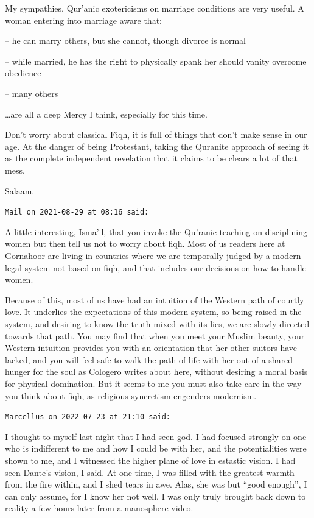 \begin{footnotesize}
\begin{sffamily}
My sympathies. Qur'anic exotericisms on marriage conditions are very useful. A woman entering into marriage aware that:

– he can marry others, but she cannot, though divorce is normal

– while married, he has the right to physically spank her should vanity overcome obedience

– many others

…are all a deep Mercy I think, especially for this time. 

Don't worry about classical Fiqh, it is full of things that don't make sense in our age. At the danger of being Protestant, taking the Quranite approach of seeing it as the complete independent revelation that it claims to be clears a lot of that mess.

Salaam.


\hfill

\texttt{Mail on 2021-08-29 at 08:16 said: }

A little interesting, Isma'il, that you invoke the Qu'ranic teaching on disciplining women but then tell us not to worry about fiqh. Most of us readers here at Gornahoor are living in countries where we are temporally judged by a modern legal system not based on fiqh, and that includes our decisions on how to handle women.

Because of this, most of us have had an intuition of the Western path of courtly love. It underlies the expectations of this modern system, so being raised in the system, and desiring to know the truth mixed with its lies, we are slowly directed towards that path. You may find that when you meet your Muslim beauty, your Western intuition provides you with an orientation that her other suitors have lacked, and you will feel safe to walk the path of life with her out of a shared hunger for the soul as Cologero writes about here, without desiring a moral basis for physical domination. But it seems to me you must also take care in the way you think about fiqh, as religious syncretism engenders modernism.


\hfill

\texttt{Marcellus on 2022-07-23 at 21:10 said: }

I thought to myself last night that I had seen god. I had focused strongly on one who is indifferent to me and how I could be with her, and the potentialities were shown to me, and I witnessed the higher plane of love in estastic vision. I had seen Dante's vision, I said. At one time, I was filled with the greatest warmth from the fire within, and I shed tears in awe. Alas, she was but “good enough”, I can only assume, for I know her not well. I was only truly brought back down to reality a few hours later from a manosphere video.


\end{sffamily}\end{footnotesize}
